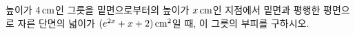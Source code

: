 \hspace*{2mm}\begin{minipage}[t]{\dimexpr\linewidth-2mm\relax}\vspace{0pt}
높이가 $4\mkern3mu \mathrm{cm}$인 그릇을 밑면으로부터의 높이가 $x\mkern3mu \mathrm{cm}$인 지점에서 밑면과 평행한 평면으로 자른 단면의 넓이가 $(e^{2x}+x+2)\mkern3mu \mathrm{cm}^2$일 때, 이 그릇의 부피를 구하시오.\end{minipage}
